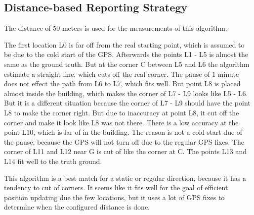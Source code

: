 \subsection{Distance-based Reporting Strategy}
The distance of 50 meters is used for the measurements of this algorithm.

The first location L0 is far off from the real starting point, which is assumed to be due to the cold start of the GPS. Afterwards the points L1 - L5 is almost the same as the ground truth. But at the corner C between L5 and L6 the algorithm estimate a straight line, which cuts off the real corner. The pause of 1 minute does not effect the path from L6 to L7, which fits well. But point L8 is placed almost inside the building, which makes the corner of L7 - L9 looks like L5 - L6. But it is a different situation because the corner of L7 - L9 should have the point L8 to make the corner right. But due to inaccuracy at point L8, it cut off the corner and make it look like L8 was not there. There is a low accuracy at the point L10, which is far of in the building. The reason is not a cold start due of the pause, because the GPS will not turn off due to the regular GPS fixes. The corner of L11 and L12 near G is cut of like the corner at C. The points L13 and L14 fit well to the truth ground.

This algorithm is a best match for a static or regular direction, because it has a tendency to cut of corners. It seems like it fits well for the goal of efficient position updating due the few locations, but it uses a lot of GPS fixes to determine when the configured distance is done.